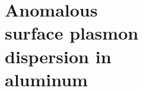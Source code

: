 \part[Anomalous surface plasmon dispersion in aluminum]{Anomalous \\surface plasmon \\dispersion in \\aluminum}